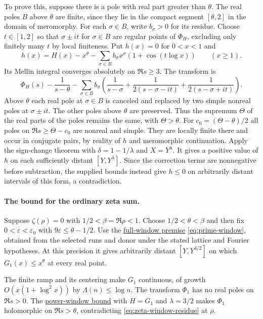 To prove this, suppose there is a pole with real part greater than
\(\theta\). The real poles \(B\) above \(\theta\) are finite, since
they lie in the compact segment \([\theta,2]\) in the domain of
meromorphy. For each \(\sigma\in B\), write \(b_\sigma>0\) for its
residue. Choose \(t\in[1,2]\) so that \(\sigma\pm it\) for
\(\sigma\in B\) are regular points of \(\Phi_H\), excluding only
finitely many \(t\) by local finiteness. Put \(h(x)=0\) for \(0<x<1\) and
\[
 h(x)=H(x)-x^\theta
       -\sum_{\sigma\in B}b_\sigma x^\sigma(1+\cos(t\log x))
       \qquad(x\ge1).
\]
Its Mellin integral converges absolutely on \(\Re s\ge3\).
The transform is
\[
 \Phi_H(s)-\frac1{s-\theta}
 -\sum_{\sigma\in B}b_\sigma
 \left(\frac1{s-\sigma}
       +\frac1{2(s-\sigma-it)}+\frac1{2(s-\sigma+it)}\right).
\]
Above \(\theta\) each real pole at \(\sigma\in B\) is canceled and
replaced by two simple nonreal poles at \(\sigma\pm it\).
The other poles above \(\theta\) are preserved. Thus the supremum
\(\Theta\) of the real parts of the poles remains the same,
with \(\Theta>\theta\). For \(c_0=(\Theta-\theta)/2\) all poles on
\(\Re s\ge\Theta-c_0\) are nonreal and simple. They are locally finite
there and occur in conjugate pairs, by reality of \(h\) and
meromorphic continuation. Apply the sign-change theorem with
\(\delta=1-1/\lambda\) and \(X=Y^\lambda\). It gives a positive
value of \(h\) on each sufficiently distant \([Y,Y^\lambda]\).
Since the correction terms are nonnegative before subtraction,
the supplied bounds instead give \(h\le0\) on arbitrarily distant
intervals of this form, a contradiction.

\paragraph{The bound for the ordinary zeta sum.}
%
Suppose \(\zeta(\rho)=0\) with \(1/2<\beta=\Re\rho<1\).
Choose \(1/2<\theta<\beta\) and then fix \(0<\varepsilon<\varepsilon_0\)
with \(9\varepsilon\le\theta-1/2\). Use the
\hyperlink{proof.apply-full-window}{full-window premise}
\eqref{eq:prime-window}, obtained from the selected runs and donor
under the stated lattice and Fourier hypotheses. At this precision
it gives arbitrarily distant \([Y,Y^{3/2}]\) on which \(G_1(x)\le x^\theta\)
at every real point.

The finite ramp and its centering make \(G_1\) continuous, of growth
\(O(x(1+\log^2x))\) by \(\Lambda(n)\le\log n\).
The transform \(\Phi_1\) has no real poles on \(\Re s>0\).
The \hyperlink{proof.one-sided-power-window-bound}{power-window bound}
with \(H=G_1\) and \(\lambda=3/2\) makes \(\Phi_1\) holomorphic on
\(\Re s>\theta\), contradicting \eqref{eq:zeta-window-residue} at \(\rho\).

